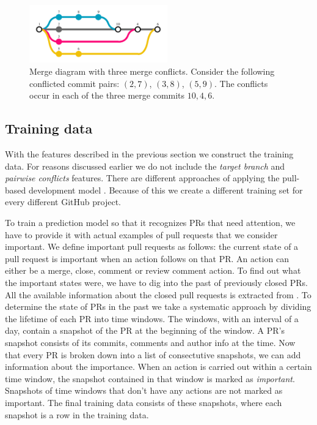 \documentclass[conference]{IEEEtran}
\begin{document}
\begin{figure}
  \centering
  \includegraphics[height=25mm, clip ,trim = 0mm 7mm 0mm 7mm]{../figs/conflicts-3.pdf}
  \caption[Merge diagram with three merge conflicts]
   {Merge diagram with three merge conflicts.
   Consider the following conflicted commit pairs: $(2,7)$, $(3,8)$, $(5,9)$.
   The conflicts occur in each of the three merge commits $10,4,6$.}
  \label{fig:conflicts-3}
\end{figure}

\subsection{Training data}
\label{sec:training}

With the features described in the previous section we construct the training data.
For reasons discussed earlier we do not include the \emph{target branch} and \emph{pairwise conflicts} features.
There are different approaches of applying the pull-based development model \cite{GPD14}.
Because of this we create a different training set for every different GitHub project.

To train a prediction model so that it recognizes PRs that need attention, we have to provide it with actual examples of pull requests that we consider important.
We define important pull requests as follows: the current state of a pull request is important when an action follows on that PR.
An action can either be a merge, close, comment or review comment action.
To find out what the important states were, we have to dig into the past of previously closed PRs.
All the available information about the closed pull requests is extracted from \ghtorrent.
To determine the state of PRs in the past we take a systematic approach by dividing the lifetime of each PR into time windows.
The windows, with an interval of a day, contain a snapshot of the PR at the beginning of the window.
A PR's snapshot consists of its commits, comments and author info at the time.
Now that every PR is broken down into a list of consectutive snapshots, we can add information about the importance.
When an action is carried out within a certain time window, the snapshot contained in that window is marked as \emph{important}.
Snapshots of time windows that don't have any actions are not marked as important.
The final training data consists of these snapshots, where each snapshot is a row in the training data.
\end{document}
